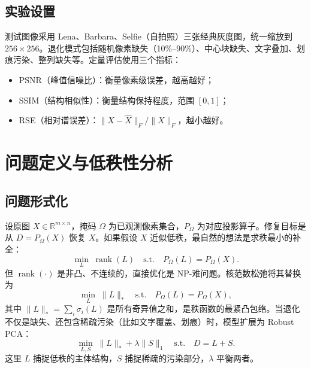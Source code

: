 \documentclass[10.5pt, a4paper]{article}
\begin{document}
\subsection{实验设置}

测试图像采用 Lena、Barbara、Selfie（自拍照）三张经典灰度图，统一缩放到 $256\times 256$。退化模式包括随机像素缺失（10\%--90\%）、中心块缺失、文字叠加、划痕污染、整列缺失等。定量评估使用三个指标：
\begin{itemize}[leftmargin=*,itemsep=1pt]
    \item PSNR（峰值信噪比）：衡量像素级误差，越高越好；
    \item SSIM（结构相似性）：衡量结构保持程度，范围 $[0,1]$；
    \item RSE（相对谱误差）：$\|X-\hat{X}\|_F / \|X\|_F$，越小越好。
\end{itemize}

\section{问题定义与低秩性分析}

\subsection{问题形式化}

设原图 $X \in \mathbb{R}^{m\times n}$，掩码 $\Omega$ 为已观测像素集合，$P_{\Omega}$ 为对应投影算子。修复目标是从 $D = P_{\Omega}(X)$ 恢复 $X$。如果假设 $X$ 近似低秩，最自然的想法是求秩最小的补全：
\begin{equation}
    \min_{L} \; \operatorname{rank}(L) \quad \text{s.t.} \quad P_{\Omega}(L) = P_{\Omega}(X).
\end{equation}
但 $\operatorname{rank}(\cdot)$ 是非凸、不连续的，直接优化是 NP-难问题。核范数松弛将其替换为
\begin{equation}
    \min_{L} \; \|L\|_{*} \quad \text{s.t.} \quad P_{\Omega}(L) = P_{\Omega}(X),
    \label{eq:nn}
\end{equation}
其中 $\|L\|_* = \sum_i \sigma_i(L)$ 是所有奇异值之和，是秩函数的最紧凸包络。当退化不仅是缺失、还包含稀疏污染（比如文字覆盖、划痕）时，模型扩展为 Robust PCA：
\begin{equation}
    \min_{L,S} \; \|L\|_* + \lambda \|S\|_1 \quad \text{s.t.} \quad D = L + S.
    \label{eq:rpca}
\end{equation}
这里 $L$ 捕捉低秩的主体结构，$S$ 捕捉稀疏的污染部分，$\lambda$ 平衡两者。
\end{document}
